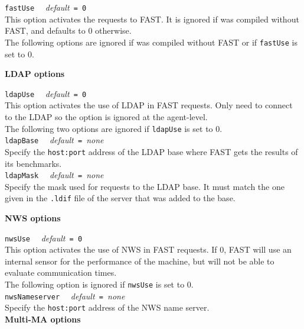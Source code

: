 \noindent
\texttt{fastUse} \ \ \emph{default}\texttt{ = 0}\\ This option activates the
requests to FAST. It is ignored if \diet was compiled without FAST, and
defaults to 0 otherwise.\\

The following options are ignored if \diet was compiled without FAST or if
\texttt{fastUse} is set to 0.

\noindent
\textbf{LDAP options}

\noindent
\texttt{ldapUse} \ \ \emph{default}\texttt{ = 0}\\ This option activates the
use of LDAP in FAST requests.  Only \seds need to connect to the LDAP so the
option is ignored at the agent-level.\\

The following two options are ignored if \texttt{ldapUse} is set to 0.\\

\noindent
\texttt{ldapBase} \ \ \emph{default}\texttt{ = }\emph{none}\\ Specify the
\texttt{host:port} address of the LDAP base where FAST gets the results of its
benchmarks.\\

\noindent
\texttt{ldapMask} \ \ \emph{default}\texttt{ = }\emph{none}\\ Specify the mask
used for requests to the LDAP base. It must match the one given in the
\texttt{.ldif} file of the server that was added to the base.


\noindent
\textbf{NWS options}

\noindent
\texttt{nwsUse} \ \ \emph{default}\texttt{ = 0}\\ This option activates the use
of NWS in FAST requests. If 0, FAST will use an internal sensor for the
performance of the machine, but will not be able to evaluate communication
times.\\

The following option is ignored if \texttt{nwsUse} is set to 0.\\

\noindent
\texttt{nwsNameserver} \ \ \emph{default}\texttt{ = }\emph{none}\\ Specify the
\texttt{host:port} address of the NWS name server.\\

\noindent
\textbf{Multi-MA options}

\label{sec:multimaconfig}

